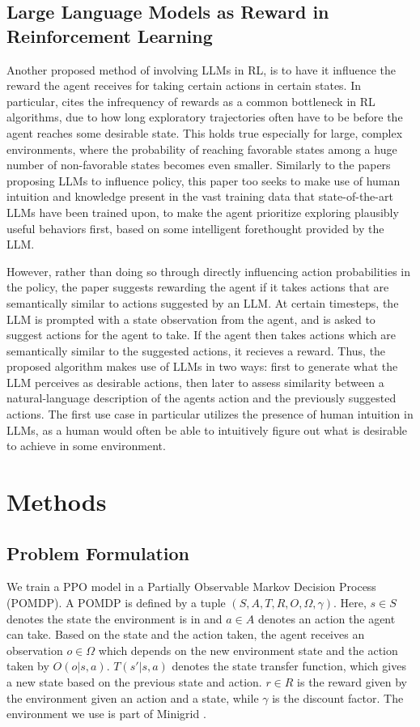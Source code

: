\documentclass[conference]{IEEEtran}
\begin{document}
\subsection{Large Language Models as Reward in Reinforcement Learning}

Another proposed method of involving LLMs in RL, is to have it influence the reward the agent receives for taking certain actions in certain states. In particular, \cite{ellm} cites the infrequency of rewards as a common bottleneck in RL algorithms, due to how long exploratory trajectories often have to be before the agent reaches some desirable state. This holds true especially for large, complex environments, where the probability of reaching favorable states among a huge number of non-favorable states becomes even smaller. Similarly to the papers proposing LLMs to influence policy, this paper too seeks to make use of human intuition and knowledge present in the vast training data that state-of-the-art LLMs have been trained upon, to make the agent prioritize exploring plausibly useful behaviors first, based on some intelligent forethought provided by the LLM.

However, rather than doing so through directly influencing action probabilities in the policy, the paper suggests rewarding the agent if it takes actions that are semantically similar to actions suggested by an LLM. At certain timesteps, the LLM is prompted with a state observation from the agent, and is asked to suggest actions for the agent to take. If the agent then takes actions which are semantically similar to the suggested actions, it recieves a reward. Thus, the proposed algorithm makes use of LLMs in two ways: first to generate what the LLM perceives as desirable actions, then later to assess similarity between a natural-language description of the agents action and the previously suggested actions. The first use case in particular utilizes the presence of human intuition in LLMs, as a human would often be able to intuitively figure out what is desirable to achieve in some environment.

\section{Methods}

\subsection{Problem Formulation}

We train a PPO model in a Partially Observable Markov Decision Process (POMDP). A POMDP is defined by a tuple $(S, A, T, R, O, \Omega, \gamma)$. Here, $s \in S$ denotes the state the environment is in and $a \in A$ denotes an action the agent can take. Based on the state and the action taken, the agent receives an observation $o \in \Omega$ which depends on the new environment state and the action taken by $O(o | s, a)$. $T(s' | s, a)$ denotes the state transfer function, which gives a new state based on the previous state and action. $r \in R$ is the reward given by the environment given an action and a state, while $\gamma$ is the discount factor.  The environment we use is part of Minigrid \cite{minigrid}. 
\end{document}
